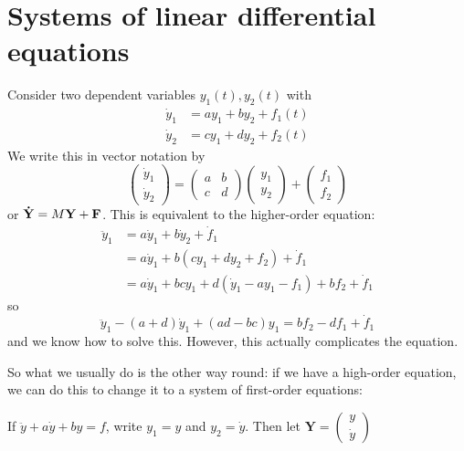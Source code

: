 \documentclass[a4paper]{article}
\begin{document}
    \section{Systems of linear differential equations}
    Consider two dependent variables $y_1(t), y_2(t)$ with
    \begin{align*}
      \dot y_1 &= ay_1 + by_2 + f_1(t)\\
      \dot y_2 &= cy_1 + dy_2 + f_2(t)
    \end{align*}
    We write this in vector notation by 
    \[
      \begin{pmatrix}
        \dot y_1\\\dot y_2 
      \end{pmatrix} = 
      \begin{pmatrix}
        a & b\\
        c & d
      \end{pmatrix}
      \begin{pmatrix}
        y_1\\y_2
      \end{pmatrix} + 
      \begin{pmatrix}
        f_1\\f_2
      \end{pmatrix}
    \]
    or $\mathbf{\dot Y} = M\mathbf{Y} + \mathbf{F}$. This is equivalent to the higher-order equation:
    \begin{align*}
      \ddot y_1 &= a\dot y_1 + b\dot y_2 + \dot f_1\\
      &= a\dot y_1 + b(cy_1 + dy_2 + f_2) + \dot f_1\\
      &= a\dot y_1 + bcy_1 + d(\dot y_1 - ay_1 - f_1) + bf_2 + \dot f_1
    \end{align*}
    so
    \[
      \ddot y_1 - (a + d)\dot y_1 + (ad - bc) y_1 = bf_2 - df_1 + \dot f_1
    \]
    and we know how to solve this. However, this actually complicates the equation.

    So what we usually do is the other way round: if we have a high-order equation, we can do this to change it to a system of first-order equations:

    If $\ddot y + a\dot y + by = f$, write $y_1 = y$ and $y_2 = \dot y$. Then let $\mathbf{Y} = 
    \begin{pmatrix}
      y\\\dot y
    \end{pmatrix}$
\end{document}
